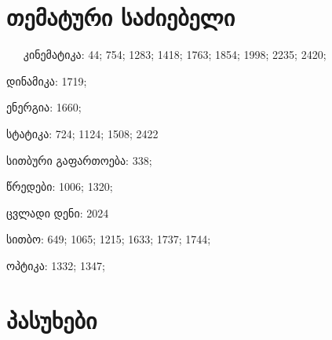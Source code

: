 \documentclass[12pt,a4paper,]{report}
\begin{document}
\chapter{თემატური საძიებელი}

$\ \quad$ კინემატიკა: 44; 754; 1283; 1418; 1763; 1854; 1998; 2235; 2420;

დინამიკა: 1719; 

ენერგია: 1660;

სტატიკა: 724; 1124; 1508; 2422

სითბური გაფართოება: 338;

წრედები: 1006; 1320;

ცვლადი დენი: 2024

სითბო: 649; 1065; 1215; 1633; 1737; 1744; 

ოპტიკა: 1332; 1347;
\chapter{პასუხები}
\end{document}
